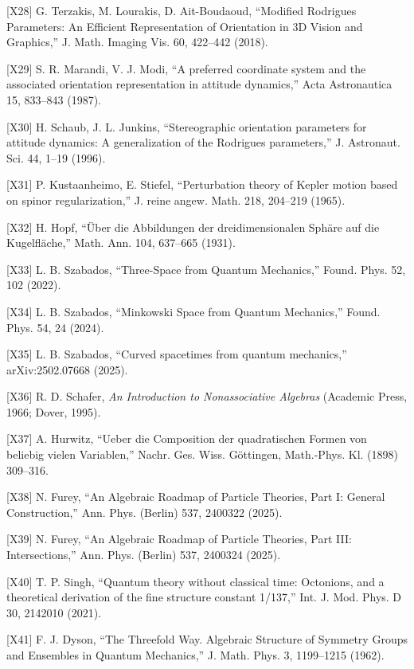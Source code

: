 \documentclass[
  a4paper,
]{article}
\begin{document}
{[}X28{]} G. Terzakis, M. Lourakis, D. Ait-Boudaoud, ``Modified
Rodrigues Parameters: An Efficient Representation of Orientation in 3D
Vision and Graphics,'' J. Math. Imaging Vis. 60, 422--442 (2018).

{[}X29{]} S. R. Marandi, V. J. Modi, ``A preferred coordinate system and
the associated orientation representation in attitude dynamics,'' Acta
Astronautica 15, 833--843 (1987).

{[}X30{]} H. Schaub, J. L. Junkins, ``Stereographic orientation
parameters for attitude dynamics: A generalization of the Rodrigues
parameters,'' J. Astronaut. Sci. 44, 1--19 (1996).

{[}X31{]} P. Kustaanheimo, E. Stiefel, ``Perturbation theory of Kepler
motion based on spinor regularization,'' J. reine angew. Math. 218,
204--219 (1965).

{[}X32{]} H. Hopf, ``Über die Abbildungen der dreidimensionalen Sphäre
auf die Kugelfläche,'' Math. Ann. 104, 637--665 (1931).

{[}X33{]} L. B. Szabados, ``Three-Space from Quantum Mechanics,'' Found.
Phys. 52, 102 (2022).

{[}X34{]} L. B. Szabados, ``Minkowski Space from Quantum Mechanics,''
Found. Phys. 54, 24 (2024).

{[}X35{]} L. B. Szabados, ``Curved spacetimes from quantum mechanics,''
arXiv:2502.07668 (2025).

{[}X36{]} R. D. Schafer, \emph{An Introduction to Nonassociative
Algebras} (Academic Press, 1966; Dover, 1995).

{[}X37{]} A. Hurwitz, ``Ueber die Composition der quadratischen Formen
von beliebig vielen Variablen,'' Nachr. Ges. Wiss. Göttingen,
Math.-Phys. Kl. (1898) 309--316.

{[}X38{]} N. Furey, ``An Algebraic Roadmap of Particle Theories, Part I:
General Construction,'' Ann. Phys. (Berlin) 537, 2400322 (2025).

{[}X39{]} N. Furey, ``An Algebraic Roadmap of Particle Theories, Part
III: Intersections,'' Ann. Phys. (Berlin) 537, 2400324 (2025).

{[}X40{]} T. P. Singh, ``Quantum theory without classical time:
Octonions, and a theoretical derivation of the fine structure constant
1/137,'' Int. J. Mod. Phys. D 30, 2142010 (2021).

{[}X41{]} F. J. Dyson, ``The Threefold Way. Algebraic Structure of
Symmetry Groups and Ensembles in Quantum Mechanics,'' J. Math. Phys. 3,
1199--1215 (1962).
\end{document}
